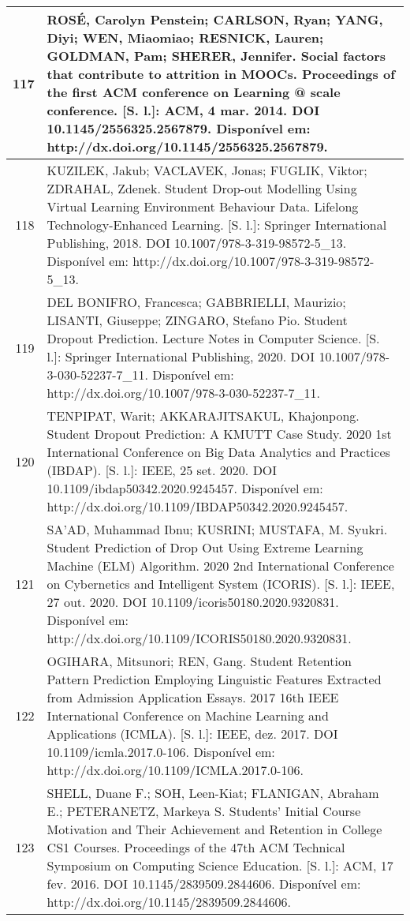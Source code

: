 \begin{apendicesenv}
\begin{longtable}[c]{|r|l|}
117 &
  \multicolumn{1}{p{14.5cm}|}{ROSÉ, Carolyn Penstein; CARLSON, Ryan; YANG, Diyi; WEN, Miaomiao; RESNICK, Lauren; GOLDMAN, Pam; SHERER, Jennifer. Social factors that contribute to attrition in MOOCs. Proceedings of the first ACM conference on Learning @ scale conference. {[}S. l.{]}: ACM, 4 mar. 2014. DOI 10.1145/2556325.2567879. Disponível em: http://dx.doi.org/10.1145/2556325.2567879.} \\ \hline
118 &
  \multicolumn{1}{p{14.5cm}|}{KUZILEK, Jakub; VACLAVEK, Jonas; FUGLIK, Viktor; ZDRAHAL, Zdenek. Student Drop-out Modelling Using Virtual Learning Environment Behaviour Data. Lifelong Technology-Enhanced Learning. {[}S. l.{]}: Springer International Publishing, 2018. DOI 10.1007/978-3-319-98572-5\_13. Disponível em: http://dx.doi.org/10.1007/978-3-319-98572-5\_13.} \\ \hline
119 &
  \multicolumn{1}{p{14.5cm}|}{DEL BONIFRO, Francesca; GABBRIELLI, Maurizio; LISANTI, Giuseppe; ZINGARO, Stefano Pio. Student Dropout Prediction. Lecture Notes in Computer Science. {[}S. l.{]}: Springer International Publishing, 2020. DOI 10.1007/978-3-030-52237-7\_11. Disponível em: http://dx.doi.org/10.1007/978-3-030-52237-7\_11.} \\ \hline
120 &
  \multicolumn{1}{p{14.5cm}|}{TENPIPAT, Warit; AKKARAJITSAKUL, Khajonpong. Student Dropout Prediction: A KMUTT Case Study. 2020 1st International Conference on Big Data Analytics and Practices (IBDAP). {[}S. l.{]}: IEEE, 25 set. 2020. DOI 10.1109/ibdap50342.2020.9245457. Disponível em: http://dx.doi.org/10.1109/IBDAP50342.2020.9245457.} \\ \hline
121 &
  \multicolumn{1}{p{14.5cm}|}{SA’AD, Muhammad Ibnu; KUSRINI; MUSTAFA, M. Syukri. Student Prediction of Drop Out Using Extreme Learning Machine (ELM) Algorithm. 2020 2nd International Conference on Cybernetics and Intelligent System (ICORIS). {[}S. l.{]}: IEEE, 27 out. 2020. DOI 10.1109/icoris50180.2020.9320831. Disponível em: http://dx.doi.org/10.1109/ICORIS50180.2020.9320831.} \\ \hline
122 &
  \multicolumn{1}{p{14.5cm}|}{OGIHARA, Mitsunori; REN, Gang. Student Retention Pattern Prediction Employing Linguistic Features Extracted from Admission Application Essays. 2017 16th IEEE International Conference on Machine Learning and Applications (ICMLA). {[}S. l.{]}: IEEE, dez. 2017. DOI 10.1109/icmla.2017.0-106. Disponível em: http://dx.doi.org/10.1109/ICMLA.2017.0-106.} \\ \hline
123 &
  \multicolumn{1}{p{14.5cm}|}{SHELL, Duane F.; SOH, Leen-Kiat; FLANIGAN, Abraham E.; PETERANETZ, Markeya S. Students’ Initial Course Motivation and Their Achievement and Retention in College CS1 Courses. Proceedings of the 47th ACM Technical Symposium on Computing Science Education. {[}S. l.{]}: ACM, 17 fev. 2016. DOI 10.1145/2839509.2844606. Disponível em: http://dx.doi.org/10.1145/2839509.2844606.} \\ \hline

\end{longtable}
\end{apendicesenv}
